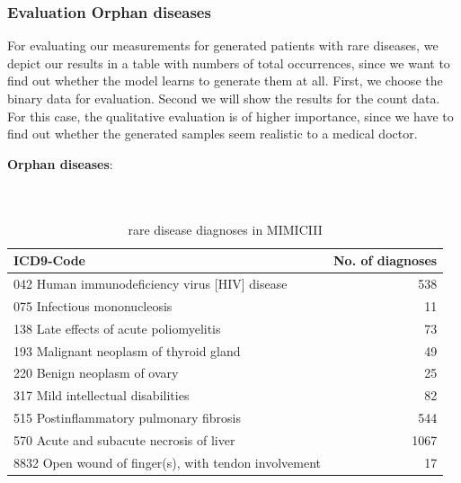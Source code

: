 \documentclass[11pt, a4paper]{book}
\begin{document}
\subsubsection{Evaluation Orphan diseases}
For evaluating our measurements for generated patients with rare diseases, we depict our results in a table with numbers of total occurrences, since we want to find out whether the model learns to generate them at all. First, we choose the binary data for evaluation. Second we will show the results for the count data.
For this case, the qualitative evaluation is of higher importance, since we have to find out whether the generated samples seem realistic to a medical doctor.


\textbf{Orphan diseases}:
\\
\\
\\
\begin{table}
\begin{center}
\begin{tabularx}{\textwidth}{X|r}
ICD9-Code & No. of diagnoses\\
\hline
042 Human immunodeficiency virus [HIV] disease & 538\\
075 Infectious mononucleosis & 11\\
138 Late effects of acute poliomyelitis & 73 \\
193 Malignant neoplasm of thyroid gland & 49 \\
220 Benign neoplasm of ovary & 25\\
317 Mild intellectual disabilities & 82\\
515 Postinflammatory pulmonary fibrosis & 544\\
570 Acute and subacute necrosis of liver & 1067\\
8832 Open wound of finger(s), with tendon involvement & 17\\ 
\end{tabularx}
\end{center}
\caption{\label{tab:rare-MIMICIII}rare disease diagnoses in MIMICIII}
\end{table}
\end{document}
